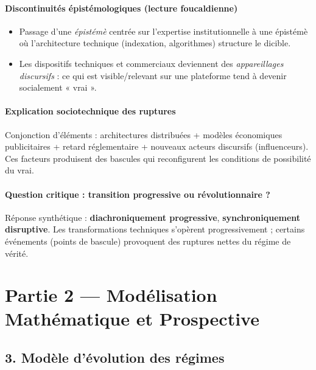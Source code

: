 \documentclass[11pt,a4paper]{article}
\begin{document}
\paragraph{Discontinuités épistémologiques (lecture foucaldienne)}
\begin{itemize}[noitemsep]
  \item Passage d'une \emph{épistémè} centrée sur l'expertise institutionnelle à une épistémè où l'architecture technique (indexation, algorithmes) structure le dicible.
  \item Les dispositifs techniques et commerciaux deviennent des \emph{appareillages discursifs} : ce qui est visible/relevant sur une plateforme tend à devenir socialement « vrai ».
\end{itemize}

\paragraph{Explication sociotechnique des ruptures}
Conjonction d'éléments : architectures distribuées + modèles économiques publicitaires + retard réglementaire + nouveaux acteurs discursifs (influenceurs). Ces facteurs produisent des bascules qui reconfigurent les conditions de possibilité du vrai.

\paragraph{Question critique : transition progressive ou révolutionnaire ?}
Réponse synthétique : \textbf{diachroniquement progressive}, \textbf{synchroniquement disruptive}. Les transformations techniques s'opèrent progressivement ; certains événements (points de bascule) provoquent des ruptures nettes du régime de vérité.


\section{Partie 2 — Modélisation Mathématique et Prospective}

\subsection{3. Modèle d'évolution des régimes}
\end{document}
